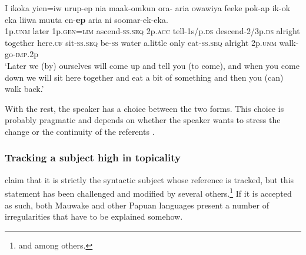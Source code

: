 \ea
\label{ex:x248}
\gll I  ikoka  yien=iw  urup-ep  nia  maak-omkun ora-  aria  owawiya  feeke  pok-ap  ik-ok eka  liiwa  muuta  en-\textbf{ep}  aria  ni  soomar-ek-eka. \\
1p.\textsc{unm} later 1p.\textsc{gen}=\textsc{lim} ascend-\textsc{ss}.\textsc{seq} 2p.\textsc{acc} tell-1s/p.\textsc{ds} descend-2/3p.\textsc{ds} alright  together  here.\textsc{cf} sit-\textsc{ss}.\textsc{seq} be-\textsc{ss} water  a.little  only  eat-\textsc{ss}.\textsc{seq} alright 2p.\textsc{unm} walk-go-\textsc{imp}.2p\\
\glt `Later we (by) ourselves will come up and tell you (to come), and when you come down we will sit here together and eat a bit of something and then you (can) walk back.'
\z
{}







With the rest, the speaker has a choice between the two forms. This choice is probably pragmatic and depends on whether the speaker wants to stress the change or the continuity of the referents \citep[47]{Franklin1983}. 

\subsubsection[Tracking a subject high in topicality ]{Tracking a subject high in topicality} 

\citet[xi]{HaimanEtAl1983} claim that it is strictly the syntactic subject whose reference is tracked, but this statement has been challenged and modified by several others.\footnote{\citet{Givon1983,Reesink1983a,Reesink1987,Roberts1988b,Roberts1997} and \citealt{Farr1999} among others.} If it is accepted as such, both Mauwake and other Papuan languages present a number of irregularities that have to be explained somehow.

